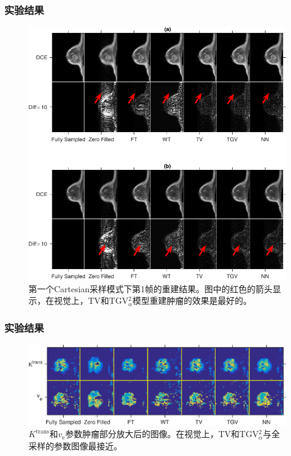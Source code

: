\documentclass{beamer}
\newcommand{\kt}{$K^\mathrm{trans}$}
\newcommand{\Ve}{$v_\mathrm{e}$}
\begin{document}
\begin{frame}
	\frametitle{实验结果}
	\begin{figure}[htbp]
\centerline{\includegraphics[width=1\textwidth]{../img/qetsr/figure2_2}}
\caption{
第一个Cartesian采样模式下第1帧的重建结果。图中的红色的箭头显示，在视觉上，TV和TGV$_\alpha^2$模型重建肿瘤的效果是最好的。
}
\end{figure}
\end{frame}

\begin{frame}
	\frametitle{实验结果}
	\begin{figure}[htbp]
\centerline{\includegraphics[width=1\textwidth]{../img/qetsr/figure4.eps}}
\caption{
\kt 和\Ve 参数肿瘤部分放大后的图像。在视觉上，TV和TGV$_{\alpha}^2$与全采样的参数图像最接近。
}
\end{figure}
\end{frame}
\end{document}
